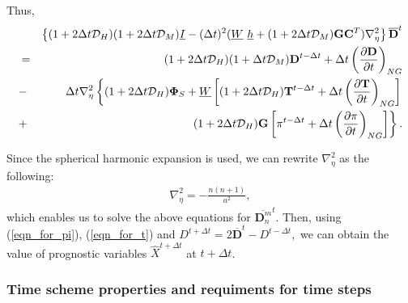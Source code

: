 Thus,
\begin{eqnarray}
      & &\left\{ ( 1+2\Delta t {\mathcal D}_H )( 1+2\Delta t {\mathcal D}_M )
           \underline{I}  
      - ( \Delta t )^{2}  ( \underline{W} \ \underline{h} 
           + (1+2\Delta t {\mathcal D}_M)
             {\mathbf{G}} {\mathbf{C}}^{T} ) \nabla^{2}_{\eta}
  \right\}
      \overline{ {\mathbf{D}} }^{t} \\
  &=& ( 1+2\Delta t {\mathcal D}_H )( 1+\Delta t {\mathcal D}_M ) 
       {\mathbf{D}}^{t-\Delta t}
  + \Delta t 
     \left( \frac{\partial {\mathbf{D}}}{\partial t} \right)_{NG}  \\
  &-&  \Delta t \nabla^{2}_{\eta}     
                   \left\{  ( 1+2\Delta t {\mathcal D}_H ) {\mathbf{\Phi}}_{S} 
                          + \underline{W} 
                            \left[ ( 1+2\Delta t {\mathcal D}_H ) 
                                    {\mathbf{T}}^{t-\Delta t}
                                  + \Delta t 
                                      \left( \frac{\partial {\mathbf{T}}}
                                                  {\partial t}     
                                      \right)_{NG} \right]
                   \right. \\
                 &+& \hspace{1.4cm} \left. ( 1+2\Delta t {\mathcal D}_H ) {\mathbf{G}} 
                            \left[ \pi^{t-\Delta t} 
                                  + \Delta t \left( \frac{\partial \pi}{\partial t} 
                                     \right)_{NG}  \right]
                   \right\} . 
\end{eqnarray}

Since the spherical harmonic expansion is used, we can rewrite
\(\nabla_{\eta}^2\) as the following:
\begin{eqnarray}
\nabla_{\eta}^2=-\frac{n(n+1)}{a^2},
\end{eqnarray}
which enables us to solve the above equations for
\(\overline{ {\mathbf{D}}_n^m }^{t}\). Then, using (\ref{eqn_for_pi}),
(\ref{eqn_for_t}) and
\(D^{t+\Delta t} = 2\overline{ {\mathbf{D}} }^{t} - D^{t-\Delta t},\)
we can obtain the value of prognostic variables \(\hat{X}^{t+\Delta t}\)
at \(t+\Delta t\).

\hypertarget{time-scheme-properties-and-requiments-for-time-steps}{%
\subsubsection{Time scheme properties and requiments for time
steps}\label{time-scheme-properties-and-requiments-for-time-steps}}

